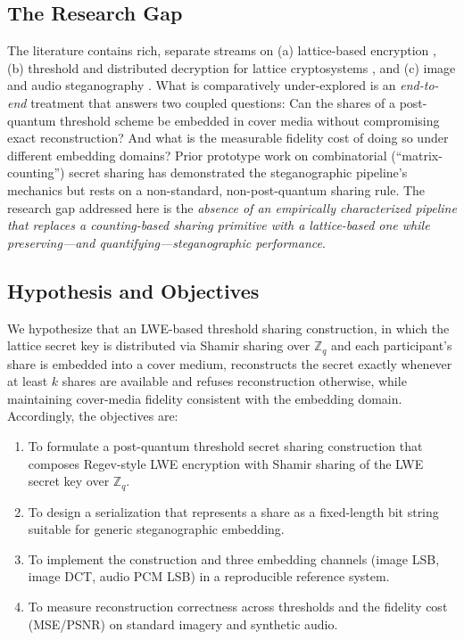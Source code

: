 \documentclass[preprint,12pt,number]{elsarticle}
\begin{document}
\subsection{The Research Gap}

The literature contains rich, separate streams on (a) lattice-based encryption
\citep{regev2005,gentry2008}, (b) threshold and distributed decryption for
lattice cryptosystems \citep{bendlin2010,desmedt1994,gemmell1997}, and (c)
image and audio steganography
\citep{chan2004,westfeld2001,johnson1998,petitcolas1999}. What is
comparatively under-explored is an \emph{end-to-end} treatment that answers two
coupled questions: Can the shares of a post-quantum threshold scheme be
embedded in cover media without compromising exact reconstruction? And what is
the measurable fidelity cost of doing so under different embedding domains?
Prior prototype work on combinatorial (``matrix-counting'') secret sharing has
demonstrated the steganographic pipeline's mechanics but rests on a
non-standard, non-post-quantum sharing rule. The research gap addressed here is
the \emph{absence of an empirically characterized pipeline that replaces a
counting-based sharing primitive with a lattice-based one while
preserving---and quantifying---steganographic performance}.

\subsection{Hypothesis and Objectives}

We hypothesize that an LWE-based threshold sharing construction, in which the
lattice secret key is distributed via Shamir sharing over $\mathbb{Z}_q$ and
each participant's share is embedded into a cover medium, reconstructs the
secret exactly whenever at least $k$ shares are available and refuses
reconstruction otherwise, while maintaining cover-media fidelity consistent
with the embedding domain. Accordingly, the objectives are:

\begin{enumerate}
  \item To formulate a post-quantum threshold secret sharing construction that
        composes Regev-style LWE encryption with Shamir sharing of the LWE
        secret key over $\mathbb{Z}_q$.
  \item To design a serialization that represents a share as a fixed-length bit
        string suitable for generic steganographic embedding.
  \item To implement the construction and three embedding channels (image LSB,
        image DCT, audio PCM LSB) in a reproducible reference system.
  \item To measure reconstruction correctness across thresholds and the
        fidelity cost (MSE/PSNR) on standard imagery and synthetic audio.
\end{enumerate}
\end{document}
